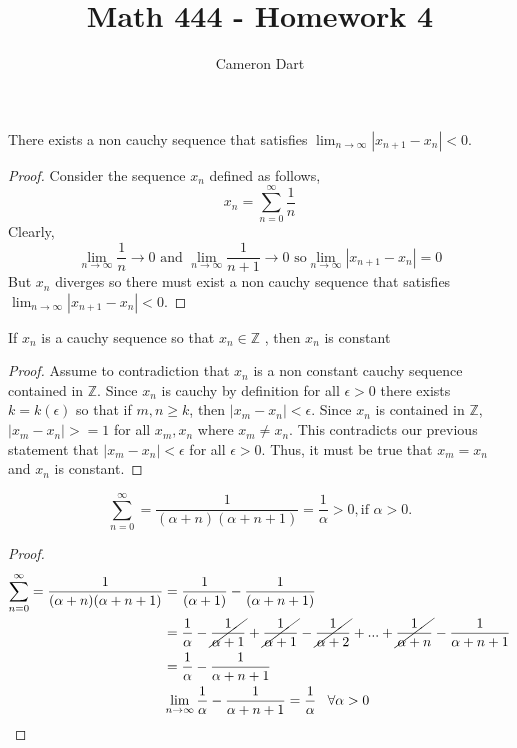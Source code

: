 \documentclass[12pt]{article}
\newcommand{\Z}{\mathbb{Z}}
\newcommand{\nifty}{\lim_{n \rightarrow \infty}}
\newenvironment{claim}[2][Claim]{\begin{trivlist}
		\item[\hskip \labelsep {\bfseries #1}\hskip \labelsep {\bfseries #2}]}{\end{trivlist}}
\begin{document}
	\title{Math 444 - Homework 4}
	\author{Cameron Dart}
	\maketitle

\begin{claim}{3.5.6}
	There exists a non cauchy sequence that satisfies $\nifty |x_{n+1} - x_n| < 0$.
\end{claim}
\begin{proof}
	Consider the sequence $x_n$ defined as follows,
	\[ x_n = \sum_{n = 0}^{\infty} \frac{1}{n} \]
	Clearly, \[ \nifty \frac{1}{n} \rightarrow 0 \text{ and } \nifty \frac{1}{n + 1} \rightarrow 0 \text{ so}  \nifty | x_{n + 1} - x_n | = 0 \]
	But $x_n$ diverges so there must exist a non cauchy sequence that satisfies  $\nifty |x_{n+1} - x_n| < 0$.
\end{proof}

\begin{claim}{3.5.7}
	If $x_n$ is a cauchy sequence so that $x_n \in \Z$ , then $x_n$ is constant
\end{claim}
\begin{proof}
	Assume to contradiction that $x_n$ is a non constant cauchy sequence contained in $\Z$. Since $x_n$ is cauchy by definition for all $\epsilon >0$ there exists $k = k(\epsilon)$ so that if $m,n \geq k$, then
	$|x_m - x_n| < \epsilon$.  Since $x_n$ is contained in $\Z$, $|x_m - x_n| >= 1$ for all $x_m,x_n$ where $x_m \neq x_n$. This contradicts our previous statement that $|x_m - x_n| < \epsilon$ for all $\epsilon > 0$. Thus, it must be true that $x_m = x_n$ and $x_n$ is constant.
\end{proof}

\begin{claim}{3.7.3b}
	\[ \sum_{n = 0}^{\infty} = \frac{1}{(\alpha + n)(\alpha + n + 1)} = \frac{1}{\alpha} > 0, \text{if } \alpha > 0. \]
\end{claim}
\begin{proof}
	\begin{align*}
		\sum_{n = 0}^{\infty} = \frac{1}{(\alpha + n)(\alpha + n + 1)} &= \frac{1}{(\alpha+ 1)} - \frac{1}{(\alpha + n + 1)}\\
		&= \frac{1}{\alpha} - \cancel{\frac{1}{\alpha + 1}} + \cancel{\frac{1}{\alpha + 1}} - \cancel{\frac{1}{\alpha + 2}} + ... + \cancel{\frac{1}{\alpha  + n}} - \frac{1}{\alpha + n + 1}\\
		& = \frac{1}{\alpha} - \frac{1}{\alpha + n + 1}\\
		& \nifty  \frac{1}{\alpha} - \frac{1}{\alpha + n + 1} = \frac{1}{\alpha} \,\,\,\,\, \forall \alpha > 0
	\end{align*}
\end{proof}
\end{document}
